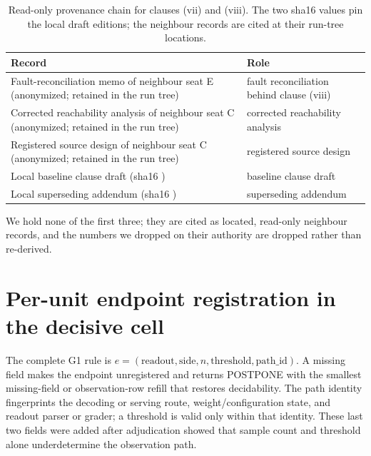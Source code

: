 \documentclass{article}
\begin{document}
\begin{table}[H]
\caption{Read-only provenance chain for clauses (vii) and (viii). The two sha16 values pin
the local draft editions; the neighbour records are cited at their run-tree locations.}
\label{tab:clauseprov}
\centering
\scriptsize
\setlength{\tabcolsep}{3pt}
\begin{tabular}{@{}L{260pt} L{120pt}@{}}
\toprule
Record & Role \\
\midrule
Fault-reconciliation memo of neighbour seat E (anonymized; retained in the run tree)
  & fault reconciliation behind clause (viii) \\
Corrected reachability analysis of neighbour seat C (anonymized; retained in the run tree)
  & corrected reachability analysis \\
Registered source design of neighbour seat C (anonymized; retained in the run tree)
  & registered source design \\
Local baseline clause draft (sha16 )
  & baseline clause draft \\
Local superseding addendum (sha16 )
  & superseding addendum \\
\bottomrule
\end{tabular}
\end{table}

We hold none of the first three; they are cited as located, read-only
neighbour records, and the numbers we dropped on their authority are dropped rather than
re-derived.

\section{Per-unit endpoint registration in the decisive cell}
\label{app:g1}

The complete G1 rule is
$e=(\text{readout},\text{side},n,\text{threshold},\text{path\_id})$.
A missing field makes the endpoint unregistered and returns POSTPONE with the smallest
missing-field or observation-row refill that restores decidability. The path identity
fingerprints the decoding or serving route, weight/configuration state, and readout parser
or grader; a threshold is valid only within that identity. These last two fields were added
after adjudication showed that sample count and threshold alone underdetermine the
observation path.
\end{document}
